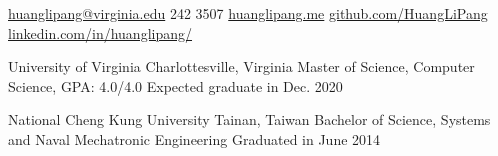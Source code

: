 \documentclass[10pt,letterpaper]{article}
\begin{document}
\sloppy  %


\nobreakvspace{0.3em}  %

\noindent\href{mailto:lh5jv@virginia.edu}{huanglipang\mbox{}@\mbox{}virginia.edu} 242 3507\sbull
\href{https://huanglipang.me}{huanglipang.me}\sbull
\href{https://github.com/HuangLiPang/}{github.com/HuangLiPang}\sbull
\href{https://www.linkedin.com/in/huanglipang/}{linkedin.com/in/huanglipang/}
\spacedhrule{0.5em}{-0.6em}  %




\headedsection
  {University of Virginia}
  {Charlottesville, Virginia} {
  \headedsubsection
    {Master of Science, Computer Science, GPA: 4.0/4.0}
    {Expected graduate in Dec. 2020}
    {
    }
}

\vspace{0.5em}

\headedsection
  {National Cheng Kung University}
  {Tainan, Taiwan} {%
  \headedsubsection
    {Bachelor of Science, Systems and Naval Mechatronic Engineering}
    {Graduated in June 2014}
    {}
}
\end{document}
